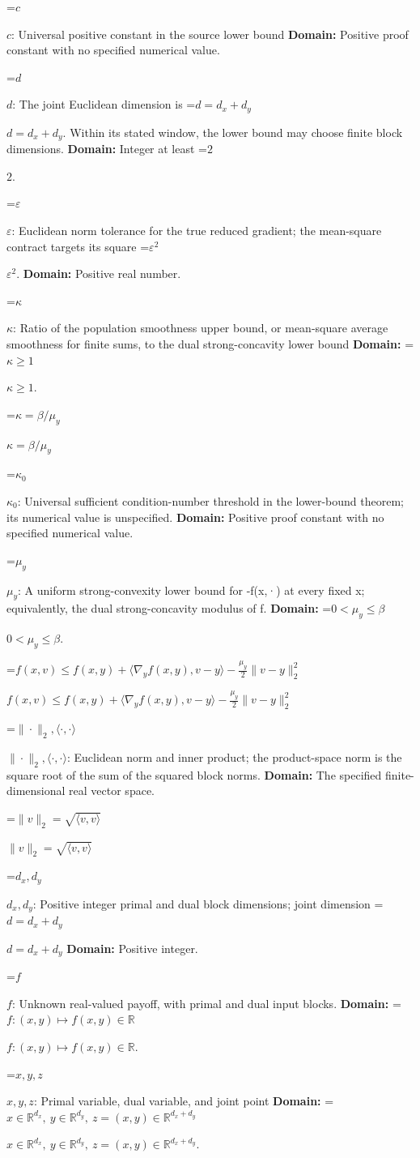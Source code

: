 \documentclass[10pt,a4paper]{article}
\newcommand{\AtlasMath}[1]{\par\begingroup\centering\setbox0=\hbox{$\displaystyle #1$}\ifdim\wd0>1.4\linewidth\typeout{ATLAS WIDE FORMULA: \the\wd0}\fi\ifdim\wd0>\linewidth\resizebox{\linewidth}{!}{\box0}\else\box0\fi\par\endgroup}
\newcommand{\AtlasInlineMath}[1]{\begingroup\setbox0=\hbox{$#1$}\ifdim\wd0>.4\linewidth\endgroup\AtlasMath{#1}\else\endgroup$#1$\fi}
\begin{document}
\AtlasInlineMath{c}: Universal positive constant in the source lower bound \textbf{Domain:} Positive proof constant with no specified numerical value.

\AtlasInlineMath{d}: The joint Euclidean dimension is \AtlasInlineMath{d=d_x+d_y}. Within its stated window, the lower bound may choose finite block dimensions. \textbf{Domain:} Integer at least \AtlasInlineMath{2}.

\AtlasInlineMath{\varepsilon}: Euclidean norm tolerance for the true reduced gradient; the mean-square contract targets its square \AtlasInlineMath{\varepsilon^2}. \textbf{Domain:} Positive real number.

\AtlasInlineMath{\kappa}: Ratio of the population smoothness upper bound, or mean-square average smoothness for finite sums, to the dual strong-concavity lower bound \textbf{Domain:} \AtlasInlineMath{\kappa\ge1}.

\AtlasInlineMath{\kappa=\beta/\mu_y}

\AtlasInlineMath{\kappa_0}: Universal sufficient condition-number threshold in the lower-bound theorem; its numerical value is unspecified. \textbf{Domain:} Positive proof constant with no specified numerical value.

\AtlasInlineMath{\mu_y}: A uniform strong-convexity lower bound for -f(x,·) at every fixed x; equivalently, the dual strong-concavity modulus of f. \textbf{Domain:} \AtlasInlineMath{0<\mu_y\le\beta}.

\AtlasInlineMath{f(x,v)\le f(x,y)+\langle\nabla_yf(x,y),v-y\rangle-\frac{\mu_y}{2}\|v-y\|_2^2}

\AtlasInlineMath{\|\cdot\|_2,\langle\cdot,\cdot\rangle}: Euclidean norm and inner product; the product-space norm is the square root of the sum of the squared block norms. \textbf{Domain:} The specified finite-dimensional real vector space.

\AtlasInlineMath{\|v\|_2=\sqrt{\langle v,v\rangle}}

\AtlasInlineMath{d_x,d_y}: Positive integer primal and dual block dimensions; joint dimension \AtlasInlineMath{d=d_x+d_y} \textbf{Domain:} Positive integer.

\AtlasInlineMath{f}: Unknown real-valued payoff, with primal and dual input blocks. \textbf{Domain:} \AtlasInlineMath{f:(x,y)\mapsto f(x,y)\in\mathbb R}.

\AtlasInlineMath{x,y,z}: Primal variable, dual variable, and joint point \textbf{Domain:} \AtlasInlineMath{x\in\mathbb R^{d_x},\ y\in\mathbb R^{d_y},\ z=(x,y)\in\mathbb R^{d_x+d_y}}.
\end{document}
